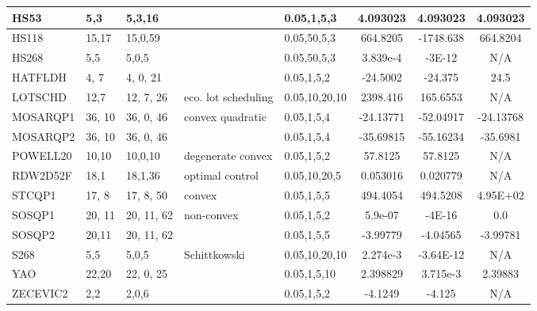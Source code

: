 \begin{landscape}
\begin{longtable}{l | l |  l  |  >{\footnotesize}p{3.5cm} | l | c | c | c  }
HS53    &  5,3  & 5,3,16    &   &  0.05,1,5,3  & 4.093023   & 4.093023   & 4.093023  \\ \hline
HS118  & 15,17  & 15,0,59  & & 0.05,50,5,3   & 664.8205  &\cellcolor{yellow} -1748.638  & \cellcolor{yellow}664.8204    \\ \hline
HS268  & 5,5  & 5,0,5  & & 0.05,50,5,3     & \cellcolor{blue} 3.839e-4 & \cellcolor{blue}-3E-12  & N/A   \\ \hline
HATFLDH  & 4, 7 &  4, 0, 21  & & 0.05,1,5,2  &  -24.5002  & -24.375 & 24.5   \\ \hline
LOTSCHD  & 12,7  &  12, 7, 26 & eco. lot scheduling &  0.05,10,20,10   &  \cellcolor{blue}2398.416 &  \cellcolor{blue}165.6553  & N/A  \\ \hline
MOSARQP1 & 36, 10 & 36, 0, 46 &convex quadratic & 0.05,1,5,4     &  -24.13771 &  \cellcolor{yellow}-52.04917 & \cellcolor{yellow} -24.13768 \\ \hline
 MOSARQP2 &36, 10 & 36, 0, 46 &     & 0.05,1,5,4   & -35.69815  & \cellcolor{yellow}-55.16234  & \cellcolor{yellow}-35.6981 \\ \hline
POWELL20 & 10,10  & 10,0,10 & degenerate convex & 0.05,1,5,2    & 57.8125 & 57.8125  & N/A  \\\hline
RDW2D52F & 18,1  & 18,1,36 & optimal control &  0.05,10,20,5 &  \cellcolor{blue}0.053016 & \cellcolor{blue} 0.020779 & N/A \\\hline
STCQP1  & 17, 8  &  17, 8, 50 & convex   &    0.05,1,5,5  & 494.4054  & 494.5208  & 4.95E+02 \\\hline
SOSQP1 &  20, 11 & 20, 11, 62 & non-convex & 0.05,1,5,2    & 5.9e-07 & -4E-16   & 0.0 \\\hline
SOSQP2 & 20,11  &  20, 11, 62 &    & 0.05,1,5,5	& -3.99779  & -4.04565  & -3.99781    \\\hline
 S268   &   5,5   & 5,0,5  &Schittkowski   & 0.05,10,20,10  &    \cellcolor{blue}2.274e-3  &  \cellcolor{blue} -3.64E-12  & N/A  \\\hline
YAO   &  22,20  & 22, 0, 25 &   &  0.05,1,5,10 & 2.398829  & \cellcolor{yellow}3.715e-3 & \cellcolor{yellow}2.39883  \\\hline
ZECEVIC2 & 2,2 & 2,0,6  & &  0.05,1,5,2 & -4.1249  & -4.125  & N/A  \\\hline
\end{longtable}   %
\end{landscape}


